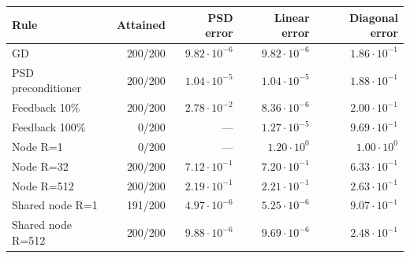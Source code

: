\begin{tabular}{lrrrr}
\hline
Rule & Attained & PSD error & Linear error & Diagonal error\\
\hline
GD & 200/200 & $9.82\cdot10^{-6}$ & $9.82\cdot10^{-6}$ & $1.86\cdot10^{-1}$\\
PSD preconditioner & 200/200 & $1.04\cdot10^{-5}$ & $1.04\cdot10^{-5}$ & $1.88\cdot10^{-1}$\\
Feedback 10\% & 200/200 & $2.78\cdot10^{-2}$ & $8.36\cdot10^{-6}$ & $2.00\cdot10^{-1}$\\
Feedback 100\% & 0/200 & --- & $1.27\cdot10^{-5}$ & $9.69\cdot10^{-1}$\\
Node R=1 & 0/200 & --- & $1.20\cdot10^{0}$ & $1.00\cdot10^{0}$\\
Node R=32 & 200/200 & $7.12\cdot10^{-1}$ & $7.20\cdot10^{-1}$ & $6.33\cdot10^{-1}$\\
Node R=512 & 200/200 & $2.19\cdot10^{-1}$ & $2.21\cdot10^{-1}$ & $2.63\cdot10^{-1}$\\
Shared node R=1 & 191/200 & $4.97\cdot10^{-6}$ & $5.25\cdot10^{-6}$ & $9.07\cdot10^{-1}$\\
Shared node R=512 & 200/200 & $9.88\cdot10^{-6}$ & $9.69\cdot10^{-6}$ & $2.48\cdot10^{-1}$\\
\hline
\end{tabular}
